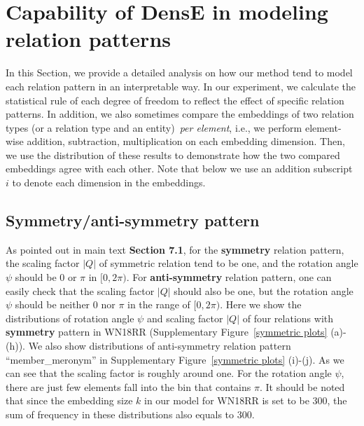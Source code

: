 \documentclass[11pt]{article}
\begin{document}
\section{Capability of DensE in modeling relation patterns}



In this Section, we provide a detailed analysis on how our method tend to model each relation pattern in an interpretable way. In our experiment, we calculate the statistical rule of each degree of freedom to reflect the effect of specific relation patterns. In addition, we also sometimes compare the embeddings of two relation types (or a relation type and an entity)~\textit{per element}, i.e., we perform element-wise addition, subtraction, multiplication on each embedding dimension. Then, we use the distribution of these results to demonstrate how the two compared embeddings agree with each other. Note that below we use an addition subscript \(i\) to denote each dimension in the embeddings.



\subsection{Symmetry/anti-symmetry pattern}
As pointed out in main text \textbf{Section 7.1}, for the \textbf{symmetry} relation pattern, the scaling factor \(|Q|\) of symmetric relation tend to be one, and the rotation angle \(\psi\) should be \(0\) or \(\pi\) in \([0, 2\pi)\). For \textbf{anti-symmetry} relation pattern, one can easily check that the scaling factor \(|Q|\) should also be one, but the rotation angle \(\psi\) should be neither \(0\) nor \(\pi\) in the range of \([0, 2\pi)\). Here we show the distributions of rotation angle \(\psi\) and scaling factor \(|Q|\) of four relations with \textbf{symmetry} pattern in WN18RR (Supplementary Figure~\ref{symmetric plots} (a)-(h)). We also show distributions of anti-symmetry relation pattern ``member\_meronym'' in Supplementary Figure~\ref{symmetric plots} (i)-(j). As we can see that the scaling factor is roughly around one. For the rotation angle \(\psi\), there are just few elements fall into the bin that contains \(\pi\). 
It should be noted that since the embedding size \(k\) in our model for WN18RR is set to be 300, the sum of frequency in these distributions also equals to 300. 
\end{document}
